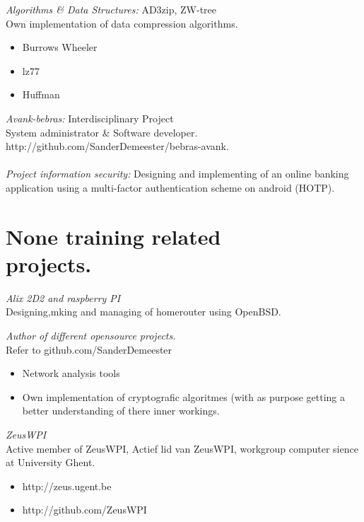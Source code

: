 \documentclass[margin, 10pt]{res} %
\begin{document}
\begin{resume}
{\sl Algorithms \& Data Structures:} AD3zip, ZW-tree \\
Own implementation of data compression algorithms.
\begin{itemize}
\item Burrows Wheeler
\item lz77
\item Huffman
\end{itemize}
{\sl Avank-bebras:} Interdisciplinary Project \\
System administrator \& Software developer. \\
http://github.com/SanderDemeester/bebras-avank.
\\ \\
{\sl Project information security:} Designing and implementing of an online banking application using a multi-factor authentication scheme on android (HOTP).
 
 
\section{None training related \\ projects.}

{\sl Alix 2D2 and raspberry PI} \\
Designing,mking and managing of homerouter using OpenBSD.

{\sl Author of different opensource projects.} \\
Refer to github.com/SanderDemeester
\begin{itemize} \itemsep -2pt
\item Network analysis tools
\item Own implementation of cryptografic algoritmes (with as purpose getting a better understanding of there inner workings.
\end{itemize}

{\sl ZeusWPI} \\
Active member of ZeusWPI, 
Actief lid van ZeusWPI, workgroup computer sience at University Ghent. \begin{itemize} \itemsep -2pt
\item{http://zeus.ugent.be}
\item{http://github.com/ZeusWPI}
\end{itemize}


\end{resume}
\end{document}
